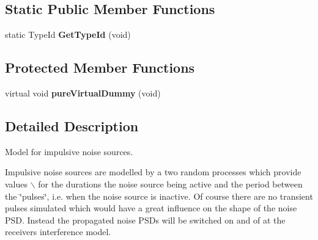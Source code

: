 \subsection*{\-Static \-Public \-Member \-Functions}
\begin{DoxyCompactItemize}
\item 
\hypertarget{classns3_1_1PLC__ImpulsiveNoiseSource_a7dbb76ce4844f72f95c4e188ce08a904}{static \-Type\-Id {\bfseries \-Get\-Type\-Id} (void)}\label{classns3_1_1PLC__ImpulsiveNoiseSource_a7dbb76ce4844f72f95c4e188ce08a904}

\end{DoxyCompactItemize}
\subsection*{\-Protected \-Member \-Functions}
\begin{DoxyCompactItemize}
\item 
\hypertarget{classns3_1_1PLC__ImpulsiveNoiseSource_a51a4f31a64001b52c8917a9dfe5e4558}{virtual void {\bfseries pure\-Virtual\-Dummy} (void)}\label{classns3_1_1PLC__ImpulsiveNoiseSource_a51a4f31a64001b52c8917a9dfe5e4558}

\end{DoxyCompactItemize}


\subsection{\-Detailed \-Description}
\-Model for impulsive noise sources. 

\-Impulsive noise sources are modelled by a two random processes which provide values $\backslash$ for the durations the noise source being active and the period between the \char`\"{}pulses\char`\"{}, i.\-e. when the noise source is inactive. \-Of course there are no transient pulses simulated which would have a great influence on the shape of the noise \-P\-S\-D. \-Instead the propagated noise \-P\-S\-Ds will be switched on and of at the receivers interference model. 

